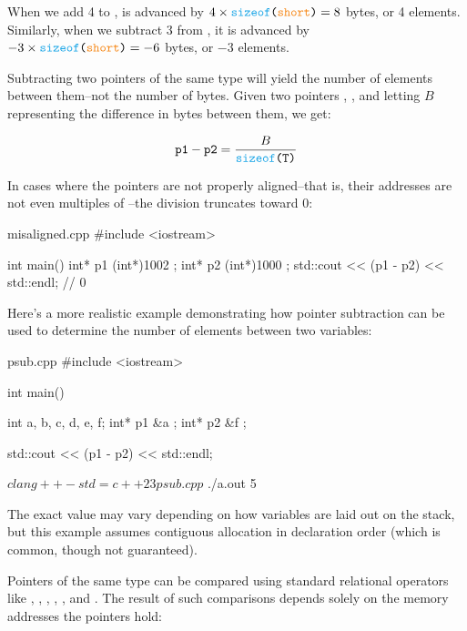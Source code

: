 \documentclass[12pt]{article}
\begin{document}
\begin{explanation}
\noindent
When we add 4 to ,  is advanced by $4 \times \texttt{\textcolor{Cerulean}{sizeof}(\textcolor{BurntOrange}{short})} = 8$ bytes, or 4 elements.
Similarly, when we subtract 3 from , it is advanced by $-3 \times \texttt{\textcolor{Cerulean}{sizeof}(\textcolor{BurntOrange}{short})} = -6$ bytes, or $-3$ elements.
\end{explanation}

\noindent
Subtracting two pointers of the same type will yield the number of elements between them--not the number of bytes.
Given two pointers , , and letting $B$ representing the difference in bytes between them, we get:

\[\texttt{p1} - \texttt{p2} = \frac{B}{\texttt{\textcolor{Cerulean}{sizeof}(T)}}\]

\noindent
In cases where the pointers are not properly aligned--that is, their addresses are not even multiples of --the division truncates toward 0:

\begin{cxx}{misaligned.cpp}
#include <iostream>

int main()
{
    int* p1 { (int*)1002 };
    int* p2 { (int*)1000 };
    std::cout << (p1 - p2) << std::endl; // 0
}
\end{cxx}

\noindent
Here's a more realistic example demonstrating how pointer subtraction can be used to determine the number of elements between two variables:

\begin{cxx}{psub.cpp}
#include <iostream>

int main()
{
	int a, b, c, d, e, f;
	int* p1 { &a };
	int* p2 { &f };

	std::cout << (p1 - p2) << std::endl;
}
\end{cxx}

\begin{terminal}
$ clang++ -std=c++23 psub.cpp
$ ./a.out
5
\end{terminal}

\begin{note}
The exact value may vary depending on how variables are laid out on the stack, but this example assumes contiguous allocation in declaration order (which is common, though not guaranteed).
\end{note}

\vspace{0.99em}
\noindent
Pointers of the same type can be compared using standard relational operators like \inlinecxx{==}, \inlinecxx{!=}, \inlinecxx{<}, \inlinecxx{>}, \inlinecxx{<=}, and \inlinecxx{>=}.
The result of such comparisons depends solely on the memory addresses the pointers hold:
\end{document}
